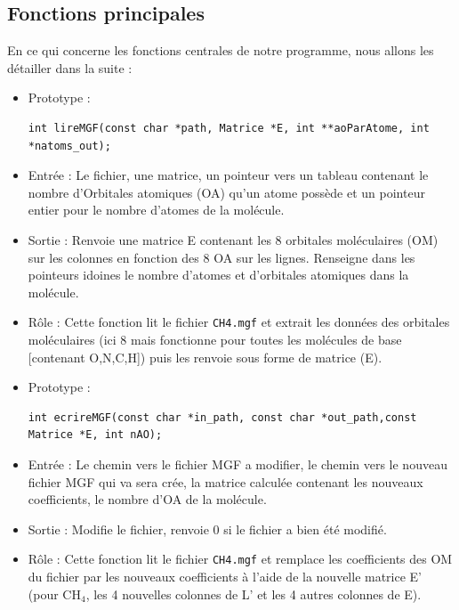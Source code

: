 \documentclass[12pt]{article}
\begin{document}
\subsection{Fonctions principales}


En ce qui concerne les fonctions centrales de notre programme, nous allons les détailler dans la suite :


\begin{itemize}
    \item Prototype : 
    \begin{verbatim}
int lireMGF(const char *path, Matrice *E, int **aoParAtome, int *natoms_out);
    \end{verbatim}
    \item Entrée : Le fichier, une matrice, un pointeur vers un tableau contenant le nombre d'Orbitales atomiques (OA) qu'un atome possède et un pointeur entier pour le nombre d'atomes de la molécule.
    \item Sortie : Renvoie une matrice E contenant les 8 orbitales moléculaires (OM) sur les colonnes en fonction des 8 OA sur les lignes. Renseigne dans les pointeurs idoines le nombre d'atomes et d'orbitales atomiques dans la molécule.
    \item Rôle : Cette fonction lit le fichier \texttt{CH4.mgf} et extrait les données des orbitales moléculaires (ici 8 mais fonctionne pour toutes les molécules de base [contenant O,N,C,H]) puis les renvoie sous forme de matrice (E).
\end{itemize}


\begin{itemize}
    \item Prototype : 
    \begin{verbatim}
int ecrireMGF(const char *in_path, const char *out_path,const Matrice *E, int nAO);
    \end{verbatim}
    \item Entrée : Le chemin vers le fichier MGF a modifier, le chemin vers le nouveau fichier MGF qui va sera crée, la  matrice calculée contenant les nouveaux coefficients, le nombre d'OA de la molécule.
    \item Sortie : Modifie le fichier, renvoie 0 si le fichier a bien été modifié.
    \item Rôle : Cette fonction lit le fichier \texttt{CH4.mgf} et remplace les coefficients des OM du fichier par les nouveaux coefficients à l'aide de la nouvelle matrice E' (pour CH$_4$, les 4 nouvelles colonnes de L' et les 4 autres colonnes de E).
\end{itemize}
\end{document}
